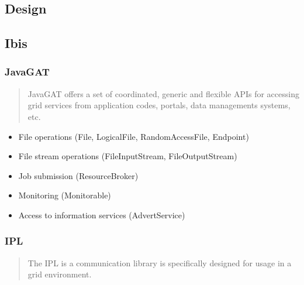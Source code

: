 \documentclass{beamer}
\begin{document}
\subsection{Design}

\subsection{Ibis}
\frame
{
	\frametitle{JavaGAT}
	\begin{quote}
    JavaGAT offers a set of coordinated, generic and flexible APIs for accessing
    grid services from application codes, portals, data managements systems, etc.
    \end{quote}
	
	\begin{itemize}
      \item File operations (File, LogicalFile, RandomAccessFile, Endpoint)
      \item File stream operations (FileInputStream, FileOutputStream)
      \item Job submission (ResourceBroker)
      \item Monitoring (Monitorable)
      \item Access to information services (AdvertService)
    \end{itemize}
}

\frame
{
	\frametitle{IPL}
	\begin{quote}
    The IPL is a communication library is specifically designed for usage in a
    grid environment.
    \end{quote}
}
\end{document}
